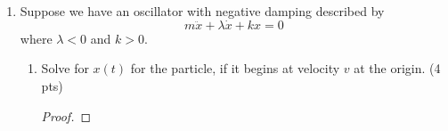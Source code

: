 \documentclass[../psets.tex]{subfiles}
\begin{document}
\begin{enumerate}
\begin{enumerate}
\begin{proof}
\begin{align*}
                F_g-F_d &= m\ddot{x}\\
                mg-k\dot{x} &= m\dv{\dot{x}}{t}\\
                \int_0^t\dd{t} &= \int_0^{\dot{x}}\frac{1}{g-k\dot{x}'/m}\dd{\dot{x}'}\\
                t &= -\frac{m}{k}\ln(g-\frac{k\dot{x}}{m})+\frac{m}{k}\ln(g)\\
                \e[-kt/m] &= 1-\frac{k\dot{x}}{mg}\\
                \dot{x} &= \frac{mg}{k}\left( 1-\e[-kt/m] \right)
            \end{align*}
            where $k$ is the proportionality constant between the retarding force and the velocity. It follows that
            \begin{align*}
                \int_0^x\dd{x} &= \frac{mg}{k}-\frac{mg}{k}\int_0^t\e[-kt/m]\dd{t}\\
                x(t) &= \frac{mg}{k}-\frac{mg}{k}\left( -\frac{m}{k}\e[-kt/m]+\frac{m}{k} \right)\\
                \Aboxed{x(t) &= \frac{m^2g}{k^2}\e[-kt/m]-\frac{m^2g}{k^2}+\frac{mg}{k}}
            \end{align*}
        \end{proof}
        \item Show that it will eventually reach a terminal velocity, and solve for this velocity. (3 pts)
        \begin{proof}
            As $t\to\infty$, $\e[-kt/m]\to 0$, leaving
            \begin{equation*}
                \boxed{\dot{x}_f = \frac{mg}{k}}
            \end{equation*}
        \end{proof}
    \end{enumerate}
    \item Suppose we have an oscillator with negative damping described by
    \begin{equation*}
        m\ddot{x}+\lambda\dot{x}+kx = 0
    \end{equation*}
    where $\lambda<0$ and $k>0$.
    \begin{enumerate}
        \item Solve for $x(t)$ for the particle, if it begins at velocity $v$ at the origin. (4 pts)
        \begin{proof}



\end{proof}
\end{enumerate}
\end{enumerate}
\end{document}
